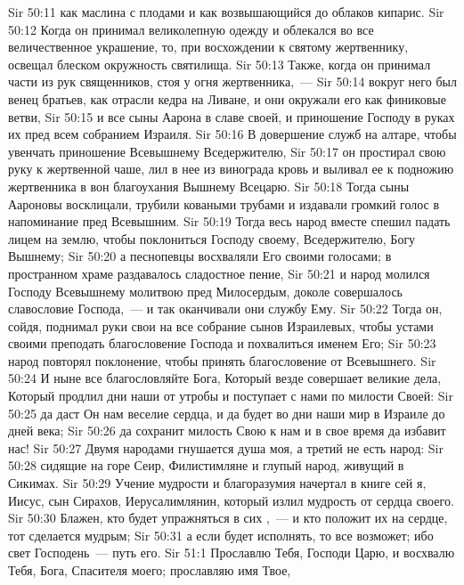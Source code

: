 \vs Sir 50:11 как маслина с плодами и как возвышающийся до облаков кипарис.
\vs Sir 50:12 Когда он принимал великолепную одежду и облекался во все величественное украшение, то, при восхождении к святому жертвеннику, освещал блеском окружность святилища.
\vs Sir 50:13 Также, когда он принимал  части из рук священников, стоя у огня жертвенника,~---
\vs Sir 50:14 вокруг него был венец братьев, как отрасли кедра на Ливане, и они окружали его как финиковые ветви,
\vs Sir 50:15 и все сыны Аарона в славе своей, и приношение Господу в руках их пред всем собранием Израиля.
\vs Sir 50:16 В довершение служб на алтаре, чтобы увенчать приношение Всевышнему Вседержителю,
\vs Sir 50:17 он простирал свою руку к жертвенной чаше, лил в нее из винограда кровь и выливал ее к подножию жертвенника в вон благоухания Вышнему Всецарю.
\vs Sir 50:18 Тогда сыны Аароновы восклицали, трубили коваными трубами и издавали громкий голос в напоминание пред Всевышним.
\vs Sir 50:19 Тогда весь народ вместе спешил падать лицем на землю, чтобы поклониться Господу своему, Вседержителю, Богу Вышнему;
\vs Sir 50:20 а песнопевцы восхваляли Его своими голосами; в пространном храме раздавалось сладостное пение,
\vs Sir 50:21 и народ молился Господу Всевышнему молитвою пред Милосердым, доколе совершалось славословие Господа,~--- и так оканчивали они службу Ему.
\vs Sir 50:22 Тогда он, сойдя, поднимал руки свои на все собрание сынов Израилевых, чтобы устами своими преподать благословение Господа и похвалиться именем Его;
\vs Sir 50:23 народ повторял поклонение, чтобы принять благословение от Всевышнего.
\vs Sir 50:24 И ныне все благословляйте Бога, Который везде совершает великие дела, Который продлил дни наши от утробы и поступает с нами по милости Своей:
\vs Sir 50:25 да даст Он нам веселие сердца, и да будет во дни наши мир в Израиле до дней века;
\vs Sir 50:26 да сохранит милость Свою к нам и в свое время да избавит нас!
\vs Sir 50:27 Двумя народами гнушается душа моя, а третий не есть народ:
\vs Sir 50:28  сидящие на горе Сеир, Филистимляне и глупый народ, живущий в Сикимах.
\vs Sir 50:29 Учение мудрости и благоразумия начертал в книге сей я, Иисус, сын Сирахов, Иерусалимлянин, который излил мудрость от сердца своего.
\vs Sir 50:30 Блажен, кто будет упражняться в сих ,~--- и кто положит их на сердце, тот сделается мудрым;
\vs Sir 50:31 а если будет исполнять, то все возможет; ибо свет Господень~--- путь его.
\vs Sir 51:1 Прославлю Тебя, Господи Царю, и восхвалю Тебя, Бога, Спасителя моего; прославляю имя Твое,
